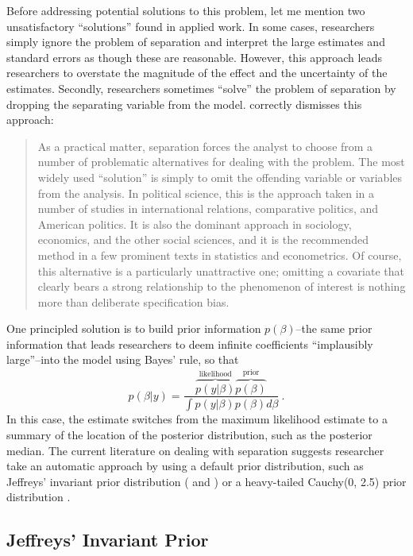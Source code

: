 \documentclass[12pt]{article}
\begin{document}
Before addressing potential solutions to this problem, let me mention two unsatisfactory ``solutions'' found in applied work. 
In some cases, researchers simply ignore the problem of separation and interpret the large estimates and standard errors as though these are reasonable. 
However, this approach leads researchers to overstate the magnitude of the effect and the uncertainty of the estimates. 
Secondly, researchers sometimes ``solve'' the problem of separation by dropping the separating variable from the model. 
\citet[pp. 161-162]{Zorn2005} correctly dismisses this approach:
\begin{quote}
As a practical matter, separation forces the analyst to choose from a number of problematic alternatives for dealing with the problem. The most widely used ``solution'' is simply to omit the offending variable or variables from the analysis. In political science, this is the approach taken in a number of studies in international relations, comparative politics, and American politics. It is also the dominant approach in sociology, economics, and the other social sciences, and it is the recommended method in a few prominent texts in statistics and econometrics. Of course, this alternative is a particularly unattractive one; omitting a covariate that clearly bears a strong relationship to the phenomenon of interest is nothing more than deliberate specification bias.
\end{quote}

One principled solution is to build prior information $p(\beta)$--the same prior information that leads researchers to deem infinite coefficients ``implausibly large''--into the model using Bayes' rule, so that 
\begin{equation}
p(\beta|y) = \dfrac{\overbrace{p(y|\beta)}^{\text{likelihood}}\overbrace{p(\beta)}^{\text{prior}}}{\int p(y|\beta)p(\beta) d\beta}~\text{.}
\end{equation}
\noindent In this case, the estimate switches from the maximum likelihood estimate to a summary of the location of the posterior distribution, such as the posterior median. 
The current literature on dealing with separation suggests researcher take an automatic approach by using a default prior distribution, such as Jeffreys' invariant prior distribution (\citealt{Jeffreys1946} and \citealt{Zorn2005}) or a heavy-tailed Cauchy(0, 2.5) prior distribution \citep{Gelmanetal2008}.

\subsection*{Jeffreys' Invariant Prior}
\end{document}
